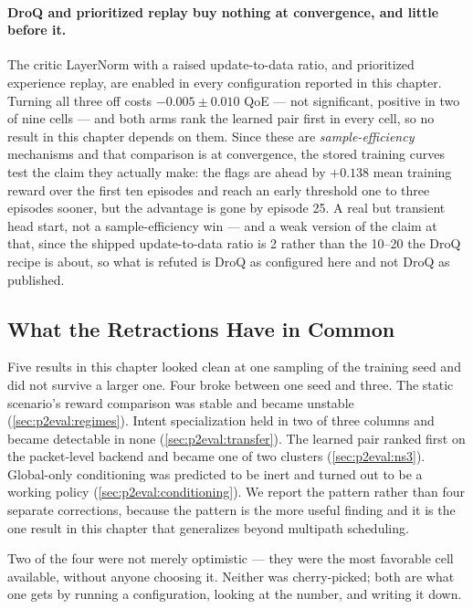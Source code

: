 \paragraph{DroQ and prioritized replay buy nothing at convergence, and little before it.} The critic
LayerNorm with a raised update-to-data ratio, and prioritized experience replay, are enabled in every
configuration reported in this chapter. Turning all three off costs $-0.005 \pm 0.010$ QoE --- not
significant, positive in two of nine cells --- and both arms rank the learned pair first in every cell,
so no result in this chapter depends on them. Since these are \emph{sample-efficiency} mechanisms and
that comparison is at convergence, the stored training curves test the claim they actually make: the
flags are ahead by $+0.138$ mean training reward over the first ten episodes and reach an early
threshold one to three episodes sooner, but the advantage is gone by episode 25. A real but transient
head start, not a sample-efficiency win --- and a weak version of the claim at that, since the shipped
update-to-data ratio is 2 rather than the 10--20 the DroQ recipe is about, so what is refuted is DroQ
as configured here and not DroQ as published.

\subsection{What the Retractions Have in Common}
\label{sec:p2eval:seeds}

Five results in this chapter looked clean at one sampling of the training seed and did not survive a
larger one. Four broke between one seed and three. The static scenario's reward comparison was stable
and became unstable
(\cref{sec:p2eval:regimes}). Intent specialization held in two of three columns and became detectable in
none (\cref{sec:p2eval:transfer}). The learned pair ranked first on the packet-level backend and became
one of two clusters (\cref{sec:p2eval:ns3}). Global-only conditioning was predicted to be inert and
turned out to be a working policy (\cref{sec:p2eval:conditioning}). We report the pattern rather than
four separate corrections, because the pattern is the more useful finding and it is the one result in
this chapter that generalizes beyond multipath scheduling.

Two of the four were not merely optimistic --- they were the most favorable cell available, without
anyone choosing it. Neither was cherry-picked; both are what one gets by running a configuration,
looking at the number, and writing it down.

